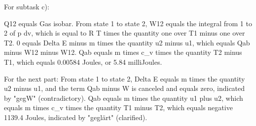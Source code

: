 For subtask c):

Q12 equals Gas isobar.
From state 1 to state 2,
W12 equals the integral from 1 to 2 of p dv, which is equal to R T times the quantity one over T1 minus one over T2.
0 equals Delta E minus m times the quantity u2 minus u1, which equals Qab minus W12 minus W12.
Qab equals m times c_v times the quantity T2 minus T1, which equals 0.00584 Joules, or 5.84 milliJoules.

For the next part:
From state 1 to state 2,
Delta E equals m times the quantity u2 minus u1, and the term Qab minus W is canceled and equals zero, indicated by "gegW" (contradictory).
Qab equals m times the quantity u1 plus u2, which equals m times c_v times the quantity T1 minus T2, which equals negative 1139.4 Joules, indicated by "geglärt" (clarified).